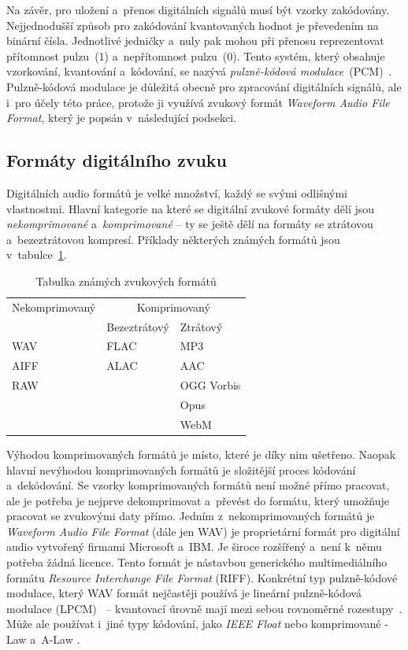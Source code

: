 Na závěr, pro uložení a~přenos digitálních signálů musí být vzorky zakódovány.
Nejjednodušší způsob pro zakódování kvantovaných hodnot je převedením na
binární čísla. Jednotlivé jedničky a~nuly pak mohou při přenosu reprezentovat
přítomnost pulzu~(1) a~nepřítomnost pulzu~(0). Tento systém, který obsahuje
vzorkování, kvantování a~kódování, se nazývá \textit{pulzně-kódová
modulace}~(PCM)~\cite{Oliver1948}. Pulzně-kódová modulace je důležitá obecně
pro zpracování digitálních signálů, ale i~pro účely této práce, protože ji
využívá zvukový formát \textit{Waveform Audio File Format}, který je popsán
v~následující podsekci.

\subsection*{Formáty digitálního zvuku}
\label{sub:digital-audio-formats}

Digitálních audio formátů je velké množství, každý se svými odlišnými
vlastnostmi. Hlavní kategorie na které se digitální zvukové formáty dělí jsou
\textit{nekomprimované} a~\textit{komprimované} -- ty se ještě dělí na formáty
se ztrátovou a~bezeztrátovou kompresí. Příklady některých známých formátů jsou
v~tabulce~\ref{tab:audio-formats}.

\begin{table}[H]
    \vskip6pt
    \caption{Tabulka známých zvukových formátů}
    \vskip6pt
    \centering
    \begin{tabular}{lll}
        \toprule
        Nekomprimovaný & \multicolumn{2}{c}{Komprimovaný} \\
        \cmidrule(r){2-3}
                       & Bezeztrátový & Ztrátový \\
        \midrule
        WAV  & FLAC & MP3 \\
        AIFF & ALAC & AAC \\
        RAW  &      & OGG Vorbis \\
             &      & Opus \\
             &      & WebM \\
        \bottomrule
    \end{tabular}
    \label{tab:audio-formats}
\end{table}

Výhodou komprimovaných formátů je místo, které je díky nim ušetřeno. Naopak
hlavní nevýhodou komprimovaných formátů je složitější proces kódování
a~dekódování. Se vzorky komprimovaných formátů není možné přímo pracovat, ale
je potřeba je nejprve dekomprimovat a~převést do formátu, který umožňuje
pracovat se zvukovými daty přímo. Jedním z~nekomprimovaných formátů je
\textit{Waveform Audio File Format} (dále jen WAV) je proprietární formát pro
digitální audio vytvořený firmami Microsoft a~IBM. Je široce rozšířený a~není
k~němu potřeba žádná licence. Tento formát je nástavbou generického
multimediálního formátu \textit{Resource Interchange File Format} (RIFF).
Konkrétní typ pulzně-kódové modulace, který WAV formát nejčastěji používá je
lineární pulzně-kódová modulace (LPCM)~\cite{RFC2361} -- kvantovací úrovně mají
mezi sebou rovnoměrné rozestupy~\cite{LPCM}. Může ale používat i~jiné typy
kódování, jako \textit{IEEE Float} nebo komprimované \textmu-Law a~A-Law
\cite{RFC2361}.

